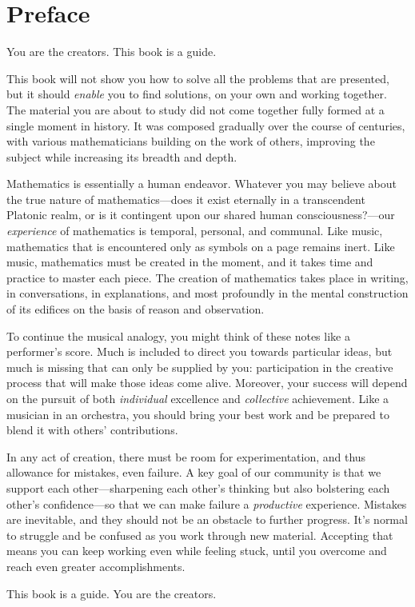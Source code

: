 \chapter*{Preface}

You are the creators. This book is a guide.

This book will not show you how to solve all the problems that are presented, but it should \emph{enable} you to find solutions, on your own and working together. The material you are about to study did not come together fully formed at a single moment in history. It was composed gradually over the course of centuries, with various mathematicians building on the work of others, improving the subject while increasing its breadth and depth.

Mathematics is essentially a human endeavor. Whatever you may believe about the true nature of mathematics---does it exist eternally in a transcendent Platonic realm, or is it contingent upon our shared human consciousness?---our \emph{experience} of mathematics is temporal, personal, and communal. Like music, mathematics that is encountered only as symbols on a page remains inert. Like music, mathematics must be created in the moment, and it takes time and practice to master each piece. The creation of mathematics takes place in writing, in conversations, in explanations, and most profoundly in the mental construction of its edifices on the basis of reason and observation.

To continue the musical analogy, you might think of these notes like a performer's score. Much is included to direct you towards particular ideas, but much is missing that can only be supplied by you: participation in the creative process that will make those ideas come alive. Moreover, your success will depend on the pursuit of both \emph{individual} excellence and \emph{collective} achievement. Like a musician in an orchestra, you should bring your best work and be prepared to blend it with others' contributions.

In any act of creation, there must be room for experimentation, and thus allowance for mistakes, even failure. A key goal of our community is that we support each other---sharpening each other's thinking but also bolstering each other's confidence---so that we can make failure a \emph{productive} experience. Mistakes are inevitable, and they should not be an obstacle to further progress. It's normal to struggle and be confused as you work through new material. Accepting that means you can keep working even while feeling stuck, until you overcome and reach even greater accomplishments.

This book is a guide. You are the creators.